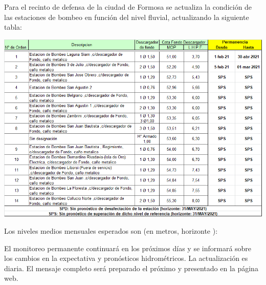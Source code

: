 \documentclass[11pt,spanish] {article}
\DeclareRobustCommand{\pronodiariocomentario}{}
\DeclareRobustCommand{\comentariofinal}{}
\DeclareRobustCommand{\fechaproximo}{}
\DeclareRobustCommand{\pronomensual}{}
\DeclareRobustCommand{\horizonte}{}
\begin{document}
\pronodiariocomentario

Para el recinto de defensa de la ciudad de Formosa se actualiza la condición de las estaciones
de bombeo en función del nivel fluvial, actualizando la siguiente tabla:
\begin{center}
\includegraphics[width=13.5cm]{tabla_bombas.png}
\end{center}
Los niveles medios mensuales esperados son (en metros, horizonte \horizonte):
\begin{center}
\pronomensual
\end{center}
\comentariofinal

El monitoreo permanente continuará en los próximos días y se informará sobre los cambios en la
expectativa y pronósticos hidrométricos. La actualización es diaria. El mensaje completo será
preparado el próximo \emph{\fechaproximo} y presentado en la página web.
\end{document}
